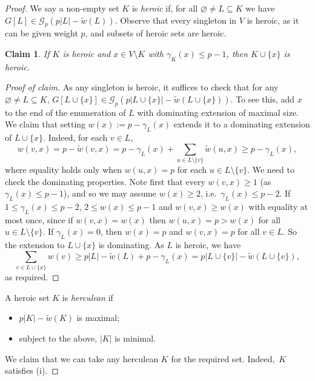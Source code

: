 \documentclass[10pt,a4paper]{article}
\newenvironment{poc}{\begin{proof}[Proof of claim]\renewcommand*{\qedsymbol}{$\blacksquare$}}{\end{proof}}
\newtheorem{claim}[theorem]{Claim}
\theoremstyle{definition}
\newcommand{\cG}{\mathcal{G}}
\begin{document}
\begin{proof}
We say a non-empty set $K$ is \emph{heroic} if, for all $\varnothing \neq L \subseteq K$ we have $G[L] \in \mathcal{G}_p(p|L|-\tilde{w}(L))$. Observe that every singleton in $V$ is heroic, as it can be given weight $p$, and subsets of heroic sets are heroic.

\begin{claim}\label{cl-hero}
If $K$ is heroic and $x \in V\setminus K$ with $\gamma_K(x) \leq p-1$, then $K \cup \{x\}$ is heroic.
\end{claim}
\begin{poc}
	As any singleton is heroic, it suffices to check that for any $\varnothing\neq L\subseteq K$, $G[L\cup \{x\}]\in\cG_p(p|L \cup \lbrace x\rbrace| - \tilde{w}(L \cup \lbrace x\rbrace))$. To see this, add $x$ to the end of the enumeration of $L$ with dominating extension of maximal size. We claim that setting $w(x):=p-\gamma_L(x)$ extends it to a dominating extension of $L\cup \{x\}$. Indeed, for each $v\in L$, \begin{equation*}%
		w(v,x)=p- \tilde{w}(v,x)= p-\gamma_L(x)+\sum_{u\in L\setminus \{v\}}\tilde{w}(u,x)\geq p-\gamma_L(x),
	\end{equation*}
	where equality holds only when $w(u,x)=p$ for each $u\in L\setminus \{v\}$.
	We need to check the dominating properties.
	Note first that every $w(v,x) \geq 1$ (as $\gamma_L(x) \leq p-1$), and so we may assume $w(x)\ge 2$, i.e.~$\gamma_L(x)\le p-2$. 
	If $1 \leq \gamma_L(x) \leq p-2$, $2 \leq w(x) \leq p-1$ and $w(v,x) \geq w(x)$ with equality at most once, since if $w(v,x)=w(x)$ then $w(u,x)=p>w(x)$ for all $u \in L\setminus\{v\}$.
	If $\gamma_L(x)=0$, then $w(x)=p$ and $w(v,x)=p$ for all $v \in L$.
	So the extension to $L \cup \{x\}$ is dominating.
	As $L$ is heroic, we have
	$$
	\sum_{v \in L\cup\lbrace x\rbrace}w(v) \geq p|L|-\tilde{w}(L)+p-\gamma_L(x) = p|L \cup \lbrace v\rbrace| - \tilde{w}(L \cup \lbrace v\rbrace),
	$$
	as required.
\end{poc}

A heroic set $K$ is \emph{herculean} if
\begin{itemize}
	\item $p|K|-\tilde{w}(K)$ is maximal; 
	\item subject to the above, $|K|$ is minimal.
\end{itemize}
We claim that we can take any herculean $K$ for the required set.
Indeed,~$K$ satisfies (i).
	

\end{proof}
\end{document}
